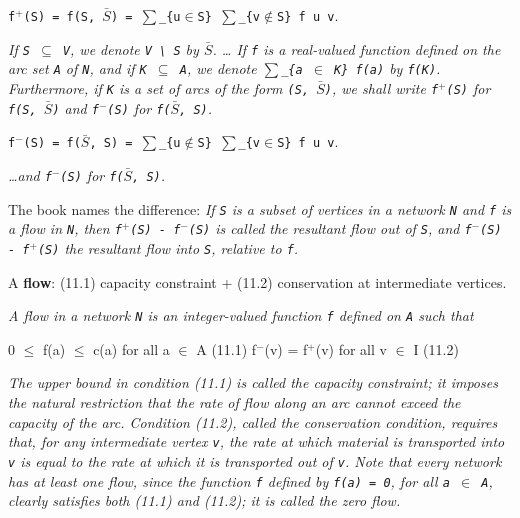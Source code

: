 \begin{definition}[$f^{+}(S) = f(S, \bar{S}) = \sum_{u\in S} \sum_{v\notin S} f u v$]
\label{Networks.Network.fOut}
\leanok
{}
\texttt{f$^{+}$(S) = f(S, $\bar{S}$) = $\sum$\_\{u$\in$S\} $\sum$\_\{v$\notin$S\} f u v}.

\emph{If \texttt{S $\subseteq$ V}, we denote \texttt{V \textbackslash{} S} by
\texttt{$\bar{S}$}. \dots{}
If \texttt{f} is a real-valued function defined on the arc set \texttt{A} of \texttt{N},
and if
\texttt{K $\subseteq$ A}, we denote \texttt{$\sum$\_\{a $\in$ K\} f(a)} by \texttt{f(K)}.  Furthermore, if \texttt{K} is a set of
arcs of the form \texttt{(S, $\bar{S}$)}, we shall write \texttt{f$^{+}$(S)} for
\texttt{f(S, $\bar{S}$)} and \texttt{f$^{-}$(S)} for
\texttt{f($\bar{S}$, S)}.}
\end{definition}

\begin{definition}[$f^{-}(S) = f(\bar{S}, S) = \sum_{u\notin S} \sum_{v\in S} f u v$]
\label{Networks.Network.fIn}
\leanok
{}
\texttt{f$^{-}$(S) = f($\bar{S}$, S) = $\sum$\_\{u$\notin$S\} $\sum$\_\{v$\in$S\} f u v}.

\emph{\dots{}and \texttt{f$^{-}$(S)} for \texttt{f($\bar{S}$, S)}.}

The book names the difference: \emph{If \texttt{S} is a subset of vertices in a network
\texttt{N} and
\texttt{f} is a flow in \texttt{N}, then \texttt{f$^{+}$(S) - f$^{-}$(S)} is called the resultant flow out of \texttt{S},
and \texttt{f$^{-}$(S) - f$^{+}$(S)} the resultant flow into \texttt{S}, relative to
\texttt{f}.}
\end{definition}

\begin{definition}
\label{Networks.Network.IsFlow}
\leanok
{}
A \textbf{flow}: (11.1) capacity constraint + (11.2) conservation at intermediate
vertices.

\emph{A flow in a network \texttt{N} is an
integer-valued function \texttt{f} defined on \texttt{A} such that}

0 $\le$ f(a) $\le$ c(a)   for all a $\in$ A                                  (11.1)
f$^{-}$(v) = f$^{+}$(v) for all v $\in$ I (11.2)

\emph{The upper bound in condition (11.1) is called the capacity constraint; it imposes
the natural restriction that the rate of flow along an arc cannot exceed the
capacity of the arc.  Condition (11.2), called the conservation condition, requires
that, for any intermediate vertex \texttt{v}, the rate at which material is transported
into \texttt{v} is equal to the rate at which it is transported out of \texttt{v}. Note
that
every network has at least one flow, since the function \texttt{f} defined by
\texttt{f(a) = 0},
for all \texttt{a $\in$ A}, clearly satisfies both (11.1) and (11.2); it is called the
zero
flow.}
\end{definition}

